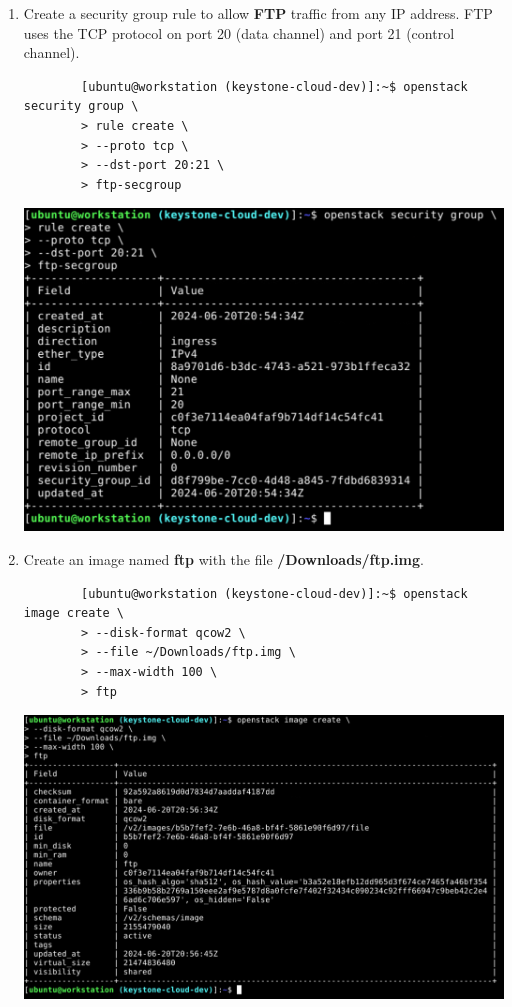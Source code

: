\documentclass[letterpaper, 12pt]{article}
\begin{document}
\begin{enumerate}
    \item Create a security group rule to allow \textbf{FTP} traffic from any IP address. FTP uses the TCP protocol on
    port 20 (data channel) and port 21 (control channel).
    \begin{lstlisting}
        [ubuntu@workstation (keystone-cloud-dev)]:~$ openstack security group \
        > rule create \
        > --proto tcp \
        > --dst-port 20:21 \
        > ftp-secgroup
    \end{lstlisting}

    \begin{center}
        \includegraphics[width=\linewidth]{images/part1/step35.png}
    \end{center}

    \item Create an image named \textbf{ftp} with the file \textbf{\texttildemid/Downloads/ftp.img}.
    \begin{lstlisting}
        [ubuntu@workstation (keystone-cloud-dev)]:~$ openstack image create \
        > --disk-format qcow2 \
        > --file ~/Downloads/ftp.img \
        > --max-width 100 \
        > ftp
    \end{lstlisting}

    \begin{center}
        \includegraphics[width=\linewidth]{images/part1/step36.png}
    \end{center}


\end{enumerate}
\end{document}
